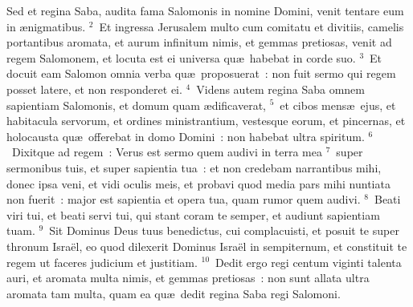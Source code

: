 \lettrine[lines=10,image=true,loversize=0.05,lraise=-0.03]{S}{}ed et regina Saba, audita fama Salomonis in nomine Domini, venit tentare eum in \ae nigmatibus.
${}^{2}$~Et ingressa Jerusalem multo cum comitatu et divitiis, camelis portantibus aromata, et aurum infinitum nimis, et gemmas pretiosas, venit ad regem Salomonem, et locuta est ei universa qu\ae\ habebat in corde suo.
${}^{3}$~Et docuit eam Salomon omnia verba qu\ae\ proposuerat~: non fuit sermo qui regem posset latere, et non responderet ei.
${}^{4}$~Videns autem regina Saba omnem sapientiam Salomonis, et domum quam \ae dificaverat,
${}^{5}$~et cibos mens\ae\ ejus, et habitacula servorum, et ordines ministrantium, vestesque eorum, et pincernas, et holocausta qu\ae\ offerebat in domo Domini~: non habebat ultra spiritum.
${}^{6}$~Dixitque ad regem~: Verus est sermo quem audivi in terra mea
${}^{7}$~super sermonibus tuis, et super sapientia tua~: et non credebam narrantibus mihi, donec ipsa veni, et vidi oculis meis, et probavi quod media pars mihi nuntiata non fuerit~: major est sapientia et opera tua, quam rumor quem audivi.
${}^{8}$~Beati viri tui, et beati servi tui, qui stant coram te semper, et audiunt sapientiam tuam.
${}^{9}$~Sit Dominus Deus tuus benedictus, cui complacuisti, et posuit te super thronum Isra\"el, eo quod dilexerit Dominus Isra\"el in sempiternum, et constituit te regem ut faceres judicium et justitiam.
${}^{10}$~Dedit ergo regi centum viginti talenta auri, et aromata multa nimis, et gemmas pretiosas~: non sunt allata ultra aromata tam multa, quam ea qu\ae\ dedit regina Saba regi Salomoni.


